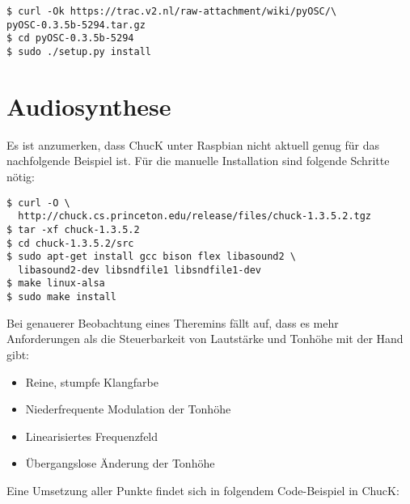 \documentclass[a4paper, fontsize=12pt, toc=bibliographynumbered]{scrreprt}
\begin{document}
\begin{verbatim}
$ curl -Ok https://trac.v2.nl/raw-attachment/wiki/pyOSC/\
pyOSC-0.3.5b-5294.tar.gz
$ cd pyOSC-0.3.5b-5294
$ sudo ./setup.py install
\end{verbatim}

\section{Audiosynthese}

Es ist anzumerken, dass ChucK unter Raspbian nicht aktuell genug für
das nachfolgende Beispiel ist.  Für die manuelle Installation sind
folgende Schritte nötig:

\begin{verbatim}
$ curl -O \
  http://chuck.cs.princeton.edu/release/files/chuck-1.3.5.2.tgz
$ tar -xf chuck-1.3.5.2
$ cd chuck-1.3.5.2/src
$ sudo apt-get install gcc bison flex libasound2 \
  libasound2-dev libsndfile1 libsndfile1-dev
$ make linux-alsa
$ sudo make install
\end{verbatim}

Bei genauerer Beobachtung eines Theremins fällt auf, dass es mehr
Anforderungen als die Steuerbarkeit von Lautstärke und Tonhöhe mit der
Hand gibt:

\begin{itemize}
\item Reine, stumpfe Klangfarbe
\item Niederfrequente Modulation der Tonhöhe
\item Linearisiertes Frequenzfeld
\item Übergangslose Änderung der Tonhöhe
\end{itemize}

Eine Umsetzung aller Punkte findet sich in folgendem Code-Beispiel in
ChucK:
\end{document}
